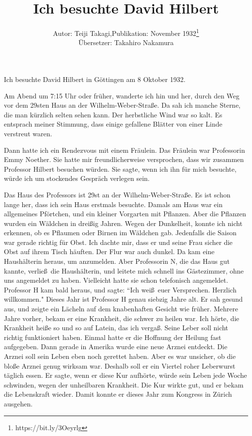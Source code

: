 \documentclass[12pt,a4j,twocolumn]{jarticle}
\title{Ich besuchte David Hilbert}
\author{Autor: Teiji Takagi,\quad Publikation: November 1932\thanks{https://bit.ly/3Oeyrlg}\\
\"Ubersetzer: Takahiro Nakamura
}
\date{}
\begin{document}
\maketitle

\noindent
Ich besuchte David Hilbert in G\"ottingen am 8 Oktober 1932.

Am Abend um 7:15 Uhr oder fr\"uher, wanderte ich hin und her, durch den Weg 
vor dem 29sten Haus an der Wilhelm-Weber-Stra\ss e.
Da sah ich manche Sterne, die man k\"urzlich selten sehen kann.
Der herbstliche Wind war so kalt.
Es entsprach meiner Stimmung,
dass einige gefallene Bl\"atter von einer Linde verstreut waren.

Dann hatte ich ein Rendezvous mit einem Fr\"aulein.
Das Fr\"aulein war Professorin Emmy Noether.
Sie hatte mir freundlicherweise versprochen, 
dass wir zusammen Professor Hilbert besuchen w\"urden.
Sie sagte, wenn ich ihn f\"ur mich besuchte,
w\"urde ich um stockendes Gespr\"ach verlegen sein.

Das Haus des Professors ist 29st an der Wilhelm-Weber-Stra\ss e.
Es ist schon lange her, dass ich sein Haus erstmals besuchte.
Damals am Haus war ein allgemeines Pf\"ortchen, und ein kleiner Vorgarten mit Pflanzen.
Aber die Pflanzen wurden ein W\"aldchen in drei\ss ig Jahren.
Wegen der Dunkelheit, konnte ich nicht erkennen, 
ob es Pflaumen oder Birnen im W\"aldchen gab.
Jedenfalls die Saison war gerade richtig f\"ur Obst.
Ich dachte mir, dass er und seine Frau sicher die Obst auf ihrem Tisch h\"auften.
Der Flur war auch dunkel. Da kam eine Haush\"alterin heraus, um anzumelden.
Aber Professorin N, die das Haus gut kannte, verlie\ss\ die Haush\"alterin,
und leitete mich schnell ins G\"astezimmer, ohne uns angemeldet zu haben.
Vielleicht hatte sie schon telefonisch angemeldet.
Professor H kam bald heraus, und sagte: ``Ich wei\ss\ euer Versprechen.
Herzlich willkommen." Dieses Jahr ist Professor H genau siebzig Jahre alt.
Er sah gesund aus, und zeigte ein L\"acheln auf dem knabenhaften Gesicht wie fr\"uher.
Mehrere Jahre vorher, bekam er eine Krankheit, die schwer zu heilen war.
Ich h\"orte, die Krankheit hei\ss e so und so auf Latein, das ich verga\ss.
Seine Leber soll nicht richtig funktioniert haben.
Einmal hatte er die Hoffnung der Heilung fast aufgegeben.
Dann gerade in Amerika wurde eine neue Arznei entdeckt.
Die Arznei soll sein Leben eben noch gerettet haben.
Aber es war unsicher, ob die blo\ss e Arznei genug wirksam war.
Deshalb soll er ein Viertel roher Leberwurst t\"aglich essen.
Er sagte, wenn er diese Kur aufh\"orte,
w\"urde sein Leben jede Woche schwinden, wegen der unheilbaren Krankheit.
Die Kur wirkte gut, und er bekam die Lebenskraft wieder.
Damit konnte er dieses Jahr zum Kongress in Z\"urich ausgehen.
\end{document}
